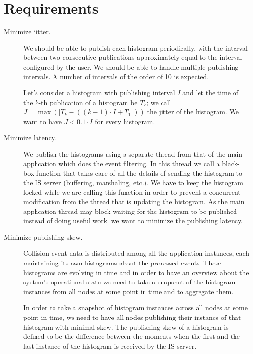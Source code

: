 \section{Requirements}

\begin{description}
\item[Minimize jitter.]

We should be able to publish each histogram periodically, with the interval between two consecutive publications approximately equal to the interval configured by the user. We should be able to handle multiple publishing intervals. A number of intervals of the order of 10 is expected.

Let's consider a histogram with publishing interval $I$ and let the time of the $k$-th publication of a histogram be $T_k$; we call $J=\max(\lvert T_k-((k-1) \cdot I+T_1\rvert))$ the jitter of the histogram. We want to have $J < 0.1\cdot I$ for every histogram.

\item[Minimize latency.]

We publish the histograms using a separate thread from that of the main application which does the event filtering. In this thread we call a black-box function that takes care of all the details of sending the histogram to the IS server (buffering, marshaling, etc.). We have to keep the histogram locked while we are calling this function in order to prevent a concurrent modification from the thread that is updating the histogram. As the main application thread may block waiting for the histogram to be published instead of doing useful work, we want to minimize the publishing latency.

\item [Minimize publishing skew.]

Collision event data is distributed among all the application instances, each maintaining its own histograms about the processed events. These histograms are evolving in time and in order to have an overview about the system's operational state we need to take a snapshot of the histogram instances from all nodes at some point in time and to aggregate them.

In order to take a snapshot of histogram instances across all nodes at some point in time, we need to have all nodes publishing their instance of that histogram with minimal skew. The publishing skew of a histogram is defined to be the difference between the moments when the first and the last instance of the histogram is received by the IS server.  


\end{description}
